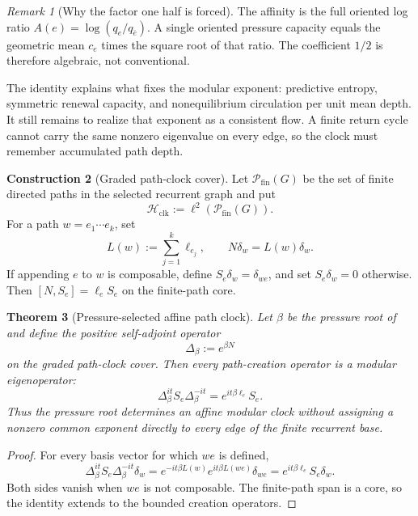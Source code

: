 \documentclass[11pt]{article}
\newtheorem{theorem}{Theorem}[section]
\theoremstyle{definition}
\newtheorem{construction}[theorem]{Construction}
\theoremstyle{remark}
\newtheorem{remark}[theorem]{Remark}
\newcommand{\Hh}{\mathcal H}
\begin{document}
\begin{remark}[Why the factor one half is forced]
The affinity is the full oriented log ratio
$A(e)=\log(q_e/q_{\bar e})$.  A single oriented pressure capacity equals the
geometric mean $c_e$ times the square root of that ratio.  The coefficient
$1/2$ is therefore algebraic, not conventional.
\end{remark}

The identity explains what fixes the modular exponent: predictive entropy,
symmetric renewal capacity, and nonequilibrium circulation per unit mean depth.
It still remains to realize that exponent as a consistent flow.  A finite return
cycle cannot carry the same nonzero eigenvalue on every edge, so the clock must
remember accumulated path depth.

\begin{construction}[Graded path-clock cover]
\label{constr:path-clock}
Let $\mathcal P_{\mathrm{fin}}(G)$ be the set of finite directed paths in the
selected recurrent graph and put
\[
 \Hh_{\mathrm{clk}}:=\ell^2(\mathcal P_{\mathrm{fin}}(G)).
\]
For a path $w=e_1\cdots e_k$, set
\[
 L(w):=\sum_{j=1}^k\ell_{e_j},
 \qquad N\delta_w=L(w)\delta_w.
\]
If appending $e$ to $w$ is composable, define $S_e\delta_w=\delta_{we}$, and
set $S_e\delta_w=0$ otherwise.  Then $[N,S_e]=\ell_eS_e$ on the finite-path
core.
\end{construction}

\begin{theorem}[Pressure-selected affine path clock]
\label{thm:pressure-path-clock}
Let $\beta$ be the pressure root of  and define the
positive self-adjoint operator
\[
 \Delta_\beta:=e^{\beta N}
\]
on the graded path-clock cover.  Then every path-creation operator is a modular
eigenoperator:
\[
 \boxed{
 \Delta_\beta^{it}S_e\Delta_\beta^{-it}
 =e^{it\beta\ell_e}S_e.}
\]
Thus the pressure root determines an affine modular clock without assigning a
nonzero common exponent directly to every edge of the finite recurrent base.
\end{theorem}

\begin{proof}
For every basis vector for which $we$ is defined,
\[
 \Delta_\beta^{it}S_e\Delta_\beta^{-it}\delta_w
 =e^{-it\beta L(w)}e^{it\beta L(we)}\delta_{we}
 =e^{it\beta\ell_e}S_e\delta_w.
\]
Both sides vanish when $we$ is not composable.  The finite-path span is a core,
so the identity extends to the bounded creation operators.
\end{proof}
\end{document}
